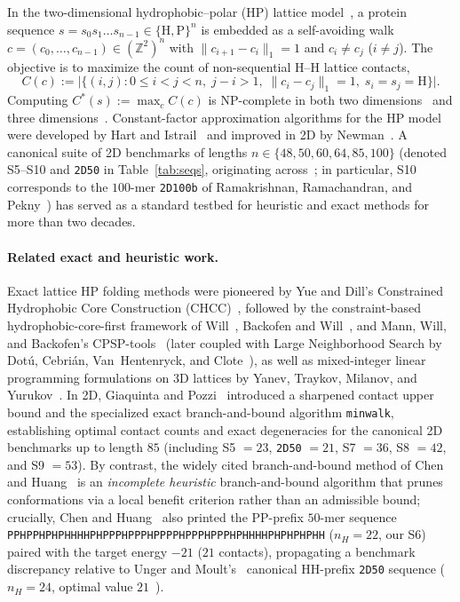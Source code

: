 \documentclass[11pt]{article}
\newcommand{\Z}{\mathbb{Z}}
\begin{document}
In the two-dimensional hydrophobic--polar (HP) lattice model~\cite{dill1985,lau1989}, a protein sequence $s = s_0 s_1 \dots s_{n-1} \in \{\mathrm{H}, \mathrm{P}\}^n$ is embedded as a self-avoiding walk $c = (c_0, \dots, c_{n-1}) \in (\Z^2)^n$ with $\|c_{i+1} - c_i\|_1 = 1$ and $c_i \ne c_j$ ($i \ne j$). The objective is to maximize the count of non-sequential H--H lattice contacts,
\begin{equation}\label{eq:contacts}
  C(c) := \bigl|\bigl\{ (i, j) : 0 \le i < j < n,\; j - i > 1,\; \|c_i - c_j\|_1 = 1,\; s_i = s_j = \mathrm{H} \bigr\}\bigr|.
\end{equation}
Computing $C^*(s) := \max_c C(c)$ is NP-complete in both two dimensions~\cite{crescenzi1998} and three dimensions~\cite{berger1998}. Constant-factor approximation algorithms for the HP model were developed by Hart and Istrail~\cite{hart1996} and improved in 2D by Newman~\cite{newman2002}. A canonical suite of 2D benchmarks of lengths $n \in \{48, 50, 60, 64, 85, 100\}$ (denoted S5--S10 and \texttt{2D50} in Table~\ref{tab:seqs}, originating across~\cite{unger1993,yue1995,beutler1996,ramakrishnan1997,bastolla1998,liang2001,hsu2003,chen2005,zhang2007,wust2012}; in particular, S10 corresponds to the $100$-mer \texttt{2D100b} of Ramakrishnan, Ramachandran, and Pekny~\cite{ramakrishnan1997}) has served as a standard testbed for heuristic and exact methods for more than two decades.

\paragraph{Related exact and heuristic work.}
Exact lattice HP folding methods were pioneered by Yue and Dill's Constrained Hydrophobic Core Construction (CHCC)~\cite{yue1995}, followed by the constraint-based hydrophobic-core-first framework of Will~\cite{will2002}, Backofen and Will~\cite{backofen2006}, and Mann, Will, and Backofen's CPSP-tools~\cite{mann2008} (later coupled with Large Neighborhood Search by Dot\'u, Cebri\'an, Van~Hentenryck, and Clote~\cite{dotu2011}), as well as mixed-integer linear programming formulations on 3D lattices by Yanev, Traykov, Milanov, and Yurukov~\cite{yanev2017}. In 2D, Giaquinta and Pozzi~\cite{giaquinta2013} introduced a sharpened contact upper bound and the specialized exact branch-and-bound algorithm \texttt{minwalk}, establishing optimal contact counts and exact degeneracies for the canonical 2D benchmarks up to length $85$ (including S5 $= 23$, \texttt{2D50} $= 21$, S7 $= 36$, S8 $= 42$, and S9 $= 53$). By contrast, the widely cited branch-and-bound method of Chen and Huang~\cite{chen2005} is an \emph{incomplete heuristic} branch-and-bound algorithm that prunes conformations via a local benefit criterion rather than an admissible bound; crucially, Chen and Huang~\cite[Table~1]{chen2005} also printed the PP-prefix $50$-mer sequence \texttt{PPHPPHPHPHHHHPHPPPHPPPHPPPPHPPPHPPPHPHHHHPHPHPHPHH} ($n_H = 22$, our S6) paired with the target energy $-21$ ($21$ contacts), propagating a benchmark discrepancy relative to Unger and Moult's~\cite{unger1993} canonical HH-prefix \texttt{2D50} sequence ($n_H = 24$, optimal value $21$~\cite{giaquinta2013}).
\end{document}
